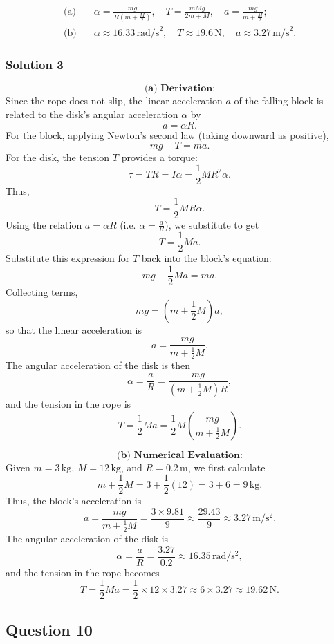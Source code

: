 \documentclass{article}
\begin{document}
\[
\begin{aligned}
\text{(a)}\quad & \alpha = \frac{mg}{R\left(m + \frac{M}{2}\right)}, \quad T = \frac{mMg}{2m+M}, \quad a = \frac{mg}{m + \frac{M}{2}};\\[1mm]
\text{(b)}\quad & \alpha \approx 16.33\,\text{rad/s}^2, \quad T \approx 19.6\,\text{N}, \quad a \approx 3.27\,\text{m/s}^2.
\end{aligned}
\]



\subsubsection{Solution 3}
\[
\textbf{(a) Derivation:}
\]
Since the rope does not slip, the linear acceleration \(a\) of the falling block is related to the disk's angular acceleration \(\alpha\) by
\[
a = \alpha R.
\]
For the block, applying Newton’s second law (taking downward as positive),
\[
mg - T = ma.
\]
For the disk, the tension \(T\) provides a torque:
\[
\tau = TR = I\alpha = \frac{1}{2}MR^2 \alpha.
\]
Thus,
\[
T = \frac{1}{2}MR\alpha.
\]
Using the relation \(a = \alpha R\) (i.e. \(\alpha = \frac{a}{R}\)), we substitute to get
\[
T = \frac{1}{2}M a.
\]
Substitute this expression for \(T\) back into the block’s equation:
\[
mg - \frac{1}{2}M a = ma.
\]
Collecting terms,
\[
mg = \left(m + \frac{1}{2}M\right)a,
\]
so that the linear acceleration is
\[
a = \frac{mg}{m + \frac{1}{2}M}.
\]
The angular acceleration of the disk is then
\[
\alpha = \frac{a}{R} = \frac{mg}{\left(m + \frac{1}{2}M\right)R},
\]
and the tension in the rope is
\[
T = \frac{1}{2}M a = \frac{1}{2}M \left(\frac{mg}{m + \frac{1}{2}M}\right).
\]

\[
\textbf{(b) Numerical Evaluation:}
\]
Given \(m = 3\,\mathrm{kg}\), \(M = 12\,\mathrm{kg}\), and \(R = 0.2\,\mathrm{m}\), we first calculate
\[
m + \frac{1}{2}M = 3 + \frac{1}{2}(12) = 3 + 6 = 9\,\mathrm{kg}.
\]
Thus, the block’s acceleration is
\[
a = \frac{mg}{m + \frac{1}{2}M} = \frac{3 \times 9.81}{9} \approx \frac{29.43}{9} \approx 3.27\,\mathrm{m/s^2}.
\]
The angular acceleration of the disk is
\[
\alpha = \frac{a}{R} = \frac{3.27}{0.2} \approx 16.35\,\mathrm{rad/s^2},
\]
and the tension in the rope becomes
\[
T = \frac{1}{2}M a = \frac{1}{2} \times 12 \times 3.27 \approx 6 \times 3.27 \approx 19.62\,\mathrm{N}.
\]


\subsection{Question 10}
\end{document}
